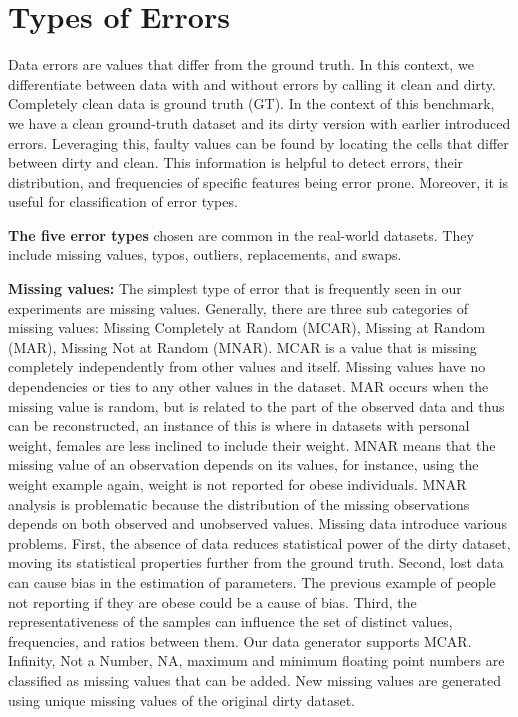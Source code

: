 \section{Types of Errors}
\label{sec:error_types}

Data errors are values that differ from the ground truth.
In this context, we differentiate between data with and without errors by calling it clean and dirty. 
Completely clean data is ground truth (GT).  
In the context of this benchmark, we have a clean ground-truth dataset and its dirty version with earlier introduced errors.  
Leveraging this, faulty values can be found by locating the cells that differ between dirty and clean. 
This information is helpful to detect errors, their distribution, and frequencies of specific features being error prone.  
Moreover, it is useful for classification of error types.

\textbf{The five error types} chosen are common in the real-world datasets. They include missing values, typos, outliers, replacements, and swaps. 

\textbf{Missing values:} 
The simplest type of error that is frequently seen in our experiments are missing values. 
Generally, there are three sub categories of missing values: 
Missing Completely at Random (MCAR), Missing at Random (MAR), Missing Not at Random (MNAR). 
MCAR is a value that is missing completely independently from other values and itself. 
Missing values have no dependencies or ties to any other values in the dataset. 
MAR occurs when the missing value is random, but is related to the part of the observed data and thus can be reconstructed, an instance of this is where in datasets with personal weight, females are less inclined to include their weight. 
MNAR means that the missing value of an observation depends on its values, for instance, using the weight example again, weight is not reported for obese individuals.
MNAR analysis is problematic because the distribution of the missing observations depends on both observed and unobserved values.
Missing data introduce various problems. 
First, the absence of data reduces statistical power of the dirty dataset, moving its statistical properties further from the ground truth.
Second, lost data can cause bias in the estimation of parameters. 
The previous example of people not reporting if they are obese could be a cause of bias. 
Third, the representativeness of the samples can influence the set of distinct values, frequencies, and ratios between them.
Our data generator supports MCAR.
Infinity, Not a Number, NA, maximum and minimum floating point numbers are classified as missing values that can be added.
New missing values are generated using unique missing values of the original dirty dataset. 

